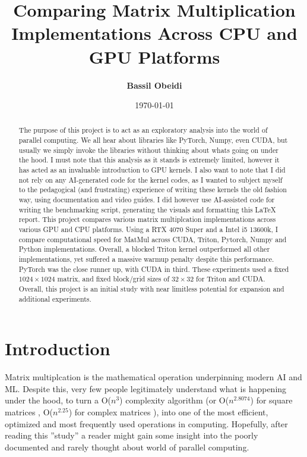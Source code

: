 \documentclass[11pt,letterpaper]{article}
\title{Comparing Matrix Multiplication Implementations Across CPU and GPU Platforms}
\author{\textbf{Bassil Obeidi}}
\date{\today}
\begin{document}
\maketitle

\begin{abstract}
The purpose of this project is to act as an exploratory analysis into the world of parallel computing. We all hear about libraries like PyTorch, Numpy, even CUDA, but usually we simply invoke the libraries without thinking about whats going on under the hood. I must note that this analysis as it stands is extremely limited, however it has acted as an invaluable introduction to GPU kernels. I also want to note that I did not rely on any AI-generated code for the kernel codes, as I wanted to subject myself to the pedagogical (and frustrating) experience of writing these kernels the old fashion way, using documentation and video guides. I did however use AI-assisted code for writing the benchmarking script, generating the visuals and formatting this LaTeX report. This project compares various matrix multiplcation implementations across various GPU and CPU platforms. Using a RTX 4070 Super and a Intel i5 13600k, I compare computational speed for MatMul across CUDA, Triton, Pytorch, Numpy and Python implementations. Overall, a blocked Triton kernel outperformed all other implementations, yet suffered a massive warmup penalty despite this performance. PyTorch was the close runner up, with CUDA in third. These experiments used a fixed $1024 \times 1024$ matrix, and fixed block/grid sizes of $32 \times 32$ for Triton and CUDA. Overall, this project is an initial study with near limitless potential for expansion and additional experiments.
\end{abstract}

\section{Introduction}
Matrix multiplcation is the mathematical operation underpinning modern AI and ML. Despite this, very few people legitimately understand what is happening under the hood, to turn a O($n^{3}$) complexity algorithm (or O($n^{2.8074}$) for square matrices \cite{strassen69}, O($n^{2.25}$) for complex matrices \cite{openai225}), into one of the most efficient, optimized and most frequently used operations in computing. Hopefully, after reading this ''study'' a reader might gain some insight into the poorly documented and rarely thought about world of parallel computing.
\end{document}
